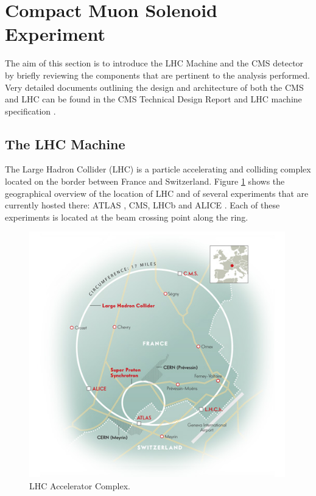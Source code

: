 \section{Compact Muon Solenoid Experiment} \label{section:higgs_cms}
The aim of this section is to introduce the LHC Machine and the CMS detector by  briefly reviewing the components that are pertinent to the analysis performed. Very detailed documents outlining the design and architecture of both the CMS and LHC can be found in the CMS Technical Design Report \cite{TDR,CMSExperiment} and LHC machine specification \cite{lhcMachine}.

\subsection{The LHC Machine} \label{subsection:higgs_cms_lhc}
The Large Hadron Collider (LHC) is a particle accelerating and colliding complex located on the border between France and Switzerland. Figure \ref{fig:higgs_cms_lhc} shows the geographical overview of the location of LHC and of several experiments that are currently hosted there: ATLAS \cite{ATLASExperiment}, CMS, LHCb \cite{LHCbExperiment} and ALICE \cite{ALICEExperiment}. Each of these experiments is located at the beam crossing point along the ring.
\begin{figure}[htbp]
    \centering
    \includegraphics[width=0.99\textwidth]{figures/ch_higgs/misc/lhcring.jpg}
    \caption{LHC Accelerator Complex.}
    \label{fig:higgs_cms_lhc}
 \end{figure}

